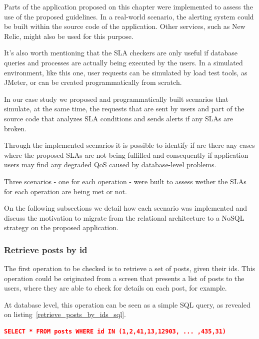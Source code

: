 Parts of the application proposed on this chapter were implemented to assess the use of the proposed guidelines. In a real-world scenario, the alerting system could be built within the source code of the application. Other services, such as New Relic, might also be used for this purpose. 

It's also worth mentioning that the SLA checkers are only useful if database queries and processes are actually being executed by the users. In a simulated environment, like this one, user requests can be simulated by load test tools, as JMeter, or can be created programmatically from scratch.

In our case study we proposed and programmatically built scenarios that simulate, at the same time, the requests that are sent by users and part of the source code that analyzes SLA conditions and sends alerts if any SLAs are broken. 

Through the implemented scenarios it is possible to identify if are there any cases where the proposed SLAs are not being fulfilled and consequently if application users may find any degraded QoS caused by database-level problems.

Three scenarios - one for each operation - were built to assess wether the SLAs for each operation are being met or not.

On the following subsections we detail how each scenario was implemented and discuss the motivation to migrate from the relational architecture to a NoSQL strategy on the proposed application. 


\subsubsection{Retrieve posts by id}

The first operation to be checked is to retrieve a set of posts, given their ids. This operation could be originated from a screen that presents a list of posts to the users, where they are able to check for details on each post, for example. 

At database level, this operation can be seen as a simple SQL query, as revealed on listing~\ref{retrieve_posts_by_ids_sql}. 

\begin{lstlisting}[language=json,firstnumber=1, caption=SQL Query - Retrieve posts by ids, label=retrieve_posts_by_ids_sql]
SELECT * FROM posts WHERE id IN (1,2,41,13,12903, ... ,435,31)
\end{lstlisting}\label{query01}

